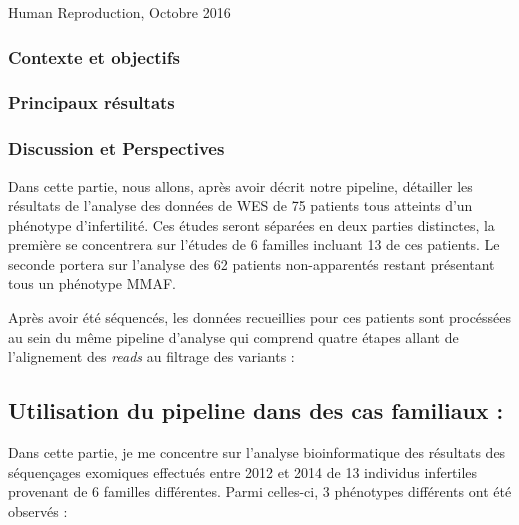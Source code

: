 \documentclass[12pt,twoside]{reedthesis}
\theoremstyle{definition}
\theoremstyle{definition}
\theoremstyle{remark}
\begin{document}
  Human Reproduction, Octobre 2016
  
  \newpage
  
  \subsubsection{Contexte et objectifs}\label{contexte-et-objectifs-2}
  
  \newpage
  
  
  
  \newpage
  
  \subsubsection{Principaux résultats}\label{principaux-resultats-2}
  
  \subsubsection{Discussion et
  Perspectives}\label{discussion-et-perspectives-2}
  
  \newpage
  
  Dans cette partie, nous allons, après avoir décrit notre pipeline,
  détailler les résultats de l'analyse des données de WES de 75 patients
  tous atteints d'un phénotype d'infertilité. Ces études seront séparées
  en deux parties distinctes, la première se concentrera sur l'études de 6
  familles incluant 13 de ces patients. Le seconde portera sur l'analyse
  des 62 patients non-apparentés restant présentant tous un phénotype
  MMAF.
  
  Après avoir été séquencés, les données recueillies pour ces patients
  sont procéssées au sein du même pipeline d'analyse qui comprend quatre
  étapes allant de l'alignement des \emph{reads} au filtrage des variants
  :
  
  \subsection{Utilisation du pipeline dans des cas familiaux
  :}\label{utilisation-du-pipeline-dans-des-cas-familiaux}
  
  Dans cette partie, je me concentre sur l'analyse bioinformatique des
  résultats des séquençages exomiques effectués entre 2012 et 2014 de 13
  individus infertiles provenant de 6 familles différentes. Parmi
  celles-ci, 3 phénotypes différents ont été observés :
  
\end{document}
